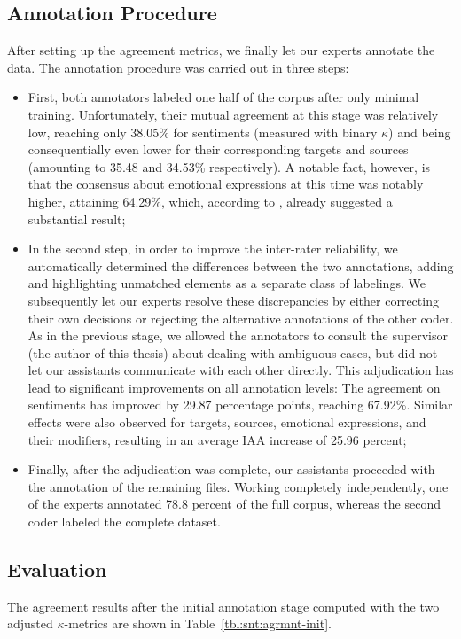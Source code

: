 \subsection{Annotation Procedure}\label{sec:astages}
After setting up the agreement metrics, we finally let our experts
annotate the data.  The annotation procedure was carried out in three
steps:
\begin{itemize}
  \item First, both annotators labeled one half of the corpus after
    only minimal training.  Unfortunately, their mutual agreement at
    this stage was relatively low, reaching only 38.05\% for
    sentiments (measured with binary $\kappa$) and being
    consequentially even lower for their corresponding targets and
    sources (amounting to 35.48 and 34.53\% respectively).  A notable
    fact, however, is that the consensus about emotional expressions
    at this time was notably higher, attaining 64.29\%, which,
    according to \citet{Landis:77}, already suggested a substantial
    result;
  \item In the second step, in order to improve the inter-rater
    reliability, we automatically determined the differences between
    the two annotations, adding and highlighting unmatched elements as
    a separate class of labelings. We subsequently let our experts
    resolve these discrepancies by either correcting their own
    decisions or rejecting the alternative annotations of the other
    coder.  As in the previous stage, we allowed the annotators to
    consult the supervisor (the author of this thesis) about dealing
    with ambiguous cases, but did not let our assistants communicate
    with each other directly.  This adjudication has lead to
    significant improvements on all annotation levels: The agreement
    on sentiments has improved by 29.87 percentage points, reaching
    67.92\%.  Similar effects were also observed for targets, sources,
    emotional expressions, and their modifiers, resulting in an
    average IAA increase of 25.96 percent;
  \item Finally, after the adjudication was complete, our assistants
    proceeded with the annotation of the remaining files.  Working
    completely independently, one of the experts annotated 78.8
    percent of the full corpus, whereas the second coder labeled the
    complete dataset.
\end{itemize}

\subsection{Evaluation}\label{sec:eval}
The agreement results after the initial annotation stage computed with
the two adjusted $\kappa$-metrics are shown in
Table~\ref{tbl:snt:agrmnt-init}.

